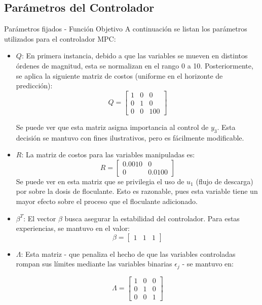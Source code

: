 \documentclass{beamer}
\begin{document}
\subsection{Parámetros del Controlador}
\begin{myFrame}{Parámetros fijados - Función Objetivo}
A continuación se listan los parámetros utilizados para el controlador MPC:
\begin{itemize}
\item $Q$: En primera instancia, debido a que las variables se mueven en distintos órdenes de magnitud, esta se normalizan en el rango 0 a 10. Posteriormente, se aplica la siguiente matriz de costos (uniforme en el horizonte de predicción):
$$Q = 
\begin{bmatrix}
1 &    0  &   0   \\
     0  &   1   &  0 \\
     0   &  0  & 100  
\end{bmatrix}
$$

Se puede ver que esta matriz asigna importancia al control de $y_3$. Esta decisión se mantuvo con fines ilustrativos, pero es fácilmente modificable.

\item $R$: La matriz de costos para las variables manipuladas es:
$$R = 
\begin{bmatrix}
0.0010   &      0 \\
         0 &   0.0100  
\end{bmatrix}
$$
Se puede ver en esta matriz que se privilegia el uso de $u_1$ (flujo de descarga) por sobre la dosis de floculante. Esto es razonable, pues esta variable tiene un mayor efecto sobre el proceso que el floculante adicionado.

\item $\beta^T$: El vector $\beta$ busca asegurar la estabilidad del controlador. Para estas experiencias, se mantuvo en el valor:
$$\beta = 
\begin{bmatrix}
1 & 1 & 1
\end{bmatrix}
$$

\item $\Lambda$: Esta matriz - que penaliza el hecho de que las variables controladas rompan sus límites mediante las variables binarias $\epsilon_j$ - se mantuvo en:

$$\Lambda = 
\begin{bmatrix}
1 &    0  &   0   \\
     0  &   1   &  0 \\
     0   &  0  & 1  
\end{bmatrix}
$$
\end{itemize}
\end{myFrame}
\end{document}
